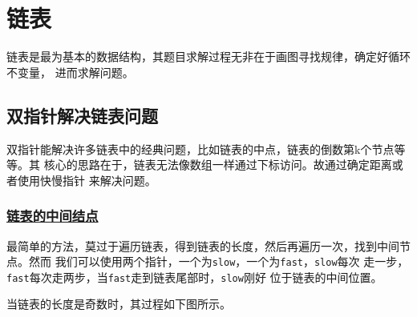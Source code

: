 \documentclass[../../main.tex]{subfiles}
\begin{document}
\setchapterpreamble[u]{\margintoc}

\chapter{链表}

链表是最为基本的数据结构，其题目求解过程无非在于画图寻找规律，确定好循环不变量，
进而求解问题。

\section{双指针解决链表问题}

双指针能解决许多链表中的经典问题，比如链表的中点，链表的倒数第k个节点等等。其
核心的思路在于，链表无法像数组一样通过下标访问。故通过确定距离或者使用快慢指针
来解决问题。

\subsection{\href{https://leetcode.cn/problems/middle-of-the-linked-list/}{链表的中间结点}}

最简单的方法，莫过于遍历链表，得到链表的长度，然后再遍历一次，找到中间节点。然而
我们可以使用两个指针，一个为\verb|slow|，一个为\verb|fast|，\verb|slow|每次
走一步，\verb|fast|每次走两步，当\verb|fast|走到链表尾部时，\verb|slow|刚好
位于链表的中间位置。

当链表的长度是奇数时，其过程如下图所示。
\end{document}
